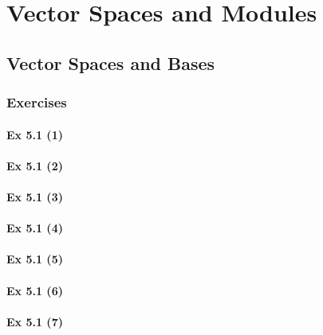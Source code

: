 \setcounter{chapter}{0}
\renewcommand{\thechapter}{5}
\chapter{Vector Spaces and Modules}\label{ch:5}
\setcounter{equation}{0}	        %

\section{Vector Spaces and Bases}\label{sec:5.1}
\subsection{Exercises}\label{sec:5.1_Exercises}

\subsubsection{Ex 5.1 (1)}\label{sec:Ex_5.1.1}

\subsubsection{Ex 5.1 (2)}\label{sec:Ex_5.1.2}

\subsubsection{Ex 5.1 (3)}\label{sec:Ex_5.1.3}

\subsubsection{Ex 5.1 (4)}\label{sec:Ex_5.1.4}

\subsubsection{Ex 5.1 (5)}\label{sec:Ex_5.1.5}

\subsubsection{Ex 5.1 (6)}\label{sec:Ex_5.1.6}

\subsubsection{Ex 5.1 (7)}\label{sec:Ex_5.1.7}

